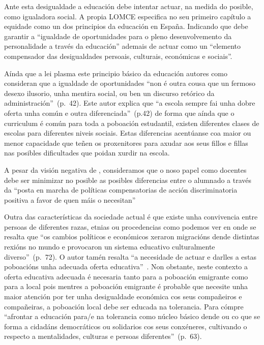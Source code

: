 Ante esta desigualdade a educación debe intentar actuar, na medida do posible, como igualadora social. A propia LOMCE especifica no seu primeiro capítulo a equidade como un dos principios da educación en España. Indicando que debe garantir a ``igualdade de oportunidades para o pleno desenvolvemento da personalidade a través da educación'' ademais de actuar como un ``elemento compensador das desigualdades persoais, culturais, económicas e sociais''.

Aínda que a lei plasma este principio básico da educación autores como  consideran que a igualdade de oportunidades ``non é outra cousa que un fermoso desexo ilusorio, unha mentira social, ou ben un discurso retórico da administración''~(p.~42). Este autor explica que ``a escola sempre fai unha dobre oferta unha común e outra diferenciada''~(p.42) de forma que aínda que o curriculum é común para toda a poboación estudantil, existen diferentes clases de escolas para diferentes niveis sociais. Estas diferencias acentúanse coa maior ou menor capacidade que teñen os proxenitores para axudar aos seus fillos e fillas nas posibles dificultades que poidan xurdir na escola.

A pesar da visión negativa de \citeauthor{funcionessocieles}, consideramos que o noso papel como docentes debe ser minimizar no posible as posibles diferencias entre o alumnado a través da ``posta en marcha de políticas compensatorias de acción discriminatoria positiva a favor de quen máis o necesitan''~\cite[p.~17]{sacristan2000educacion}

Outra das características da sociedade actual é que existe unha convivencia entre persoas de diferentes razas, etnias ou procedencias como podemos ver en  onde se resalta que ``os cambios políticos e económicos xeraron migracións dende distintas rexións no mundo e provocaron un sistema educativo culturalmente diverso''~(p.~72). O autor tamén resalta ``a necesidade de actuar e darlles a estas poboacións unha adecuada oferta educativa''~\cite[p.~72]{rivera2014practica}. Non obstante, neste contexto a oferta educativa adecuada é necesaria tanto para a poboación emigrante como para a local pois mentres a poboación emigrante é probable que necesite unha maior atención por ter unha desigualdade económica cos seus compañeiros e compañeiras, a poboación local debe ser educada na tolerancia. Para  cómpre ``afrontar a educación para/e na tolerancia como núcleo básico dende ou co que se forma a cidadáns democráticos ou solidarios cos seus conxéneres, cultivando o respecto a mentalidades, culturas e persoas diferentes''~(p.~63).

